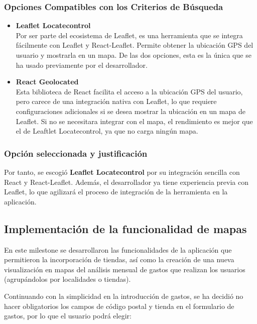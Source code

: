 \subsubsection{Opciones Compatibles con los Criterios de Búsqueda} 
\begin{itemize} 
    \item \textbf{Leaflet Locatecontrol}\\
    Por ser parte del ecosistema de Leaflet, es una herramienta que se integra fácilmente con Leaflet y React-Leaflet. Permite obtener la ubicación GPS del usuario y mostrarla en un mapa. De las dos opciones, esta es la única que se ha usado previamente por el desarrollador.
    \item \textbf{React Geolocated}\\
    Esta biblioteca de React facilita el acceso a la ubicación GPS del usuario, pero carece de una integración nativa con Leaflet, lo que requiere configuraciones adicionales si se desea mostrar la ubicación en un mapa de Leaflet. Si no se necesitara integrar con el mapa, el rendimiento es mejor que el de Leaftlet Locatecontrol, ya que no carga ningún mapa.
\end{itemize}

\subsubsection{Opción seleccionada y justificación}
Por tanto, se escogió \textbf{Leaflet Locatecontrol} por su integración sencilla con React y React-Leaflet. Además, el desarrollador ya tiene experiencia previa con Leaflet, lo que agilizará el proceso de integración de la herramienta en la aplicación\cite{leafletLocateControl2023}.





\subsection{Implementación de la funcionalidad de mapas}
En este milestone se desarrollaron las funcionalidades de la aplicación que permitieron la incorporación de tiendas, así como la creación de una nueva visualización en mapas del análisis mensual de gastos que realizan los usuarios (agrupándolos por localidades o tiendas).

Continuando con la simplicidad en la introducción de gastos, se ha decidió no hacer obligatorios los campos de código postal y tienda en el formulario de gastos, por lo que el usuario podrá elegir:

